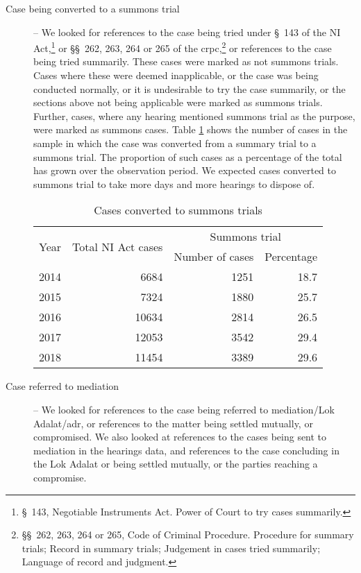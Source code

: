 \documentclass[12pt,a4paper]{article}
\begin{document}
\begin{description}
\item [Case being converted to a summons trial] -- We looked for references to the case being tried under \S~143 of the NI Act,\footnote{\S~143, Negotiable Instruments Act. Power of Court to try cases summarily.} or \S\S~262, 263, 264 or 265 of the \gls{crpc},\footnote{\S\S~262, 263, 264 or 265, Code of Criminal Procedure. Procedure for summary trials; Record in summary trials; Judgement in cases tried summarily; Language of record and judgment.} or references to the case being tried summarily. These cases were marked as not summons trials. Cases where these were deemed inapplicable, or the case was being conducted normally, or it is undesirable to try the case summarily, or the sections above not being applicable were marked as summons trials. Further, cases, where any hearing mentioned summons trial as the purpose, were marked as summons cases. Table \ref{tab:summons_yearWise} shows the number of cases in the sample in which the case was converted from a summary trial to a summons trial. The proportion of such cases as a percentage of the total has grown over the observation period. We expected cases converted to summons trial to take more days and more hearings to dispose of.

\begin{table}[!ht]
\caption{Cases converted to summons trials}\label{tab:summons_yearWise}
\centering
\footnotesize
\begin{tabular}{@{}lrrr@{}}

\toprule
\multirow{2}{*}{Year} & \multirow{2}{*}{Total NI Act cases} & \multicolumn{2}{c}{Summons trial}\\
\cmidrule{3-4}
&& Number of cases & Percentage \\
\midrule%
2014 & 6684 & 1251 & 18.7 \\
2015 & 7324 & 1880 & 25.7 \\
2016 & 10634 & 2814 & 26.5 \\
2017 & 12053 & 3542 & 29.4 \\
2018 & 11454 & 3389 & 29.6 \\
\bottomrule
\end{tabular}
\end{table}

\item[]

\item [Case referred to mediation] -- We looked for references to the case being referred to mediation/Lok Adalat/\gls{adr}, or references to the matter being settled mutually, or compromised. We also looked at references to the cases being sent to mediation in the hearings data, and references to the case concluding in the Lok Adalat or being settled mutually, or the parties reaching a compromise.


\end{description}
\end{document}
